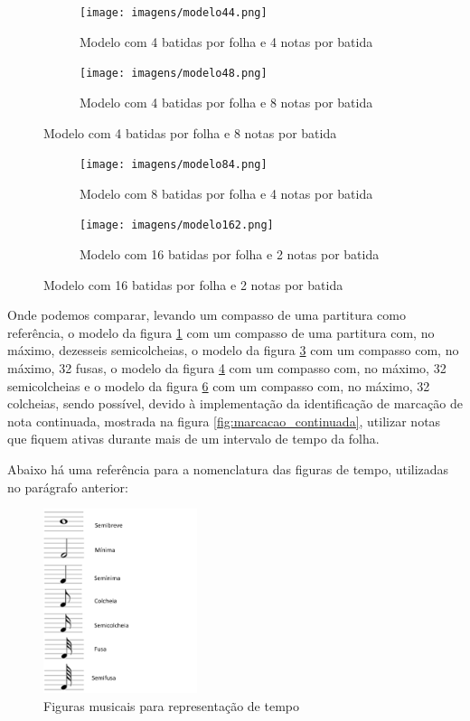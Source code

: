 \documentclass[12pt]{report}
\begin{document}
{\begin{figure}[H]
  \centering
  \begin{subfigure}{0.4\textwidth}
    \centering
    \texttt{[image: imagens/modelo44.png]}
    \caption{Modelo com 4 batidas por folha e 4 notas por batida}
    \label{fig:modelo44}
  \end{subfigure}
  \begin{subfigure}{0.4\textwidth}
    \centering
    \texttt{[image: imagens/modelo48.png]}
    \caption{Modelo com 4 batidas por folha e 8 notas por batida}
    \label{fig:modelo48}
  \end{subfigure}
\end{figure}

\begin{figure}[H]
  \centering
  \begin{subfigure}{0.4\textwidth}
    \centering
    \texttt{[image: imagens/modelo84.png]}
    \caption{Modelo com 8 batidas por folha e 4 notas por batida}
    \label{fig:modelo84}
  \end{subfigure}
  \begin{subfigure}{0.4\textwidth}
    \centering
    \texttt{[image: imagens/modelo162.png]}
    \caption{Modelo com 16 batidas por folha e 2 notas por batida}
    \label{fig:modelo162}
  \end{subfigure}
\end{figure}

Onde podemos comparar, levando um compasso de uma partitura como referência, o modelo da figura \ref{fig:modelo44} com um compasso de uma partitura com, no máximo, dezesseis semicolcheias, o modelo da figura \ref{fig:modelo48} com um compasso com, no máximo, 32 fusas, o modelo da figura \ref{fig:modelo84} com um compasso com, no máximo, 32 semicolcheias e o modelo da figura \ref{fig:modelo162} com um compasso com, no máximo, 32 colcheias, sendo possível, devido à implementação da identificação de marcação de nota continuada, mostrada na figura \ref{fig:marcacao_continuada}, utilizar notas que fiquem ativas durante mais de um intervalo de tempo da folha.

Abaixo há uma referência para a nomenclatura das figuras de tempo, utilizadas no parágrafo anterior:
\begin{figure}[H]
  \centering
  \includegraphics[width=0.4\textwidth]{imagens/tempos.png}
  \caption{Figuras musicais para representação de tempo}
  \label{fig:tempos}
\end{figure}

}
\end{document}
